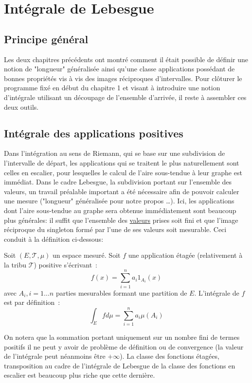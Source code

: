 \chapter{Intégrale de Lebesgue}
\section{Principe général}
Les deux chapitres précédents ont montré comment il était possible de définir
une notion de "longueur" généralisée ainsi qu'une classe applications possédant
de bonnes propriétés vis à vis des images réciproques d'intervalles. Pour
clôturer le programme fixé en début du chapitre 1 et visant à introduire une
notion d'intégrale utilisant un découpage de l'ensemble d'arrivée, il reste à
assembler ces deux outils.
\section{Intégrale des applications positives}
Dans l'intégration au sens de Riemann, qui se base sur une subdivision de
l'intervalle de départ, les applications qui se traitent le plus naturellement
sont celles en escalier, pour lesquelles le calcul de l'aire sous-tendue à leur
graphe est immédiat. Dans le cadre Lebesgue, la subdivision portant sur
l'ensemble des valeurs, un travail préalable important a été nécessaire afin de
pouvoir calculer une mesure ("longueur" généralisée pour notre propos \dots).
Ici, les applications dont l'aire sous-tendue au graphe sera obtenue
immédiatement sont beaucoup plus générales: il suffit que l'ensemble des
\underline{valeurs} prises soit fini et que l'image réciproque du singleton
formé par l'une de ses valeurs soit mesurable. Ceci conduit à la définition
ci-dessous:
\begin{mandatory}
\begin{defn}\label{ch3:int1}
Soit $(E, \mathcal{T}, \mu)$ un espace mesuré.
Soit $f$ une application étagée (relativement à la tribu $\mathcal{T}$) positive s'écrivant~:
\[
f(x) = \sum_{i=1}^n a_i 1_{A_i}(x)
\]
avec $A_i, i=1 \dots n$ parties mesurables formant une partition de $E$.
L'intégrale de $f$ est par définition~:
\[
\int_E f d\mu = \sum_{i=1}^n a_i \mu(A_i)
\]
\end{defn}
\end{mandatory}
On notera que la sommation portant uniquement sur un nombre fini de termes
positifs il ne peut y avoir de
problème de définition ou de convergence (la valeur de l'intégrale peut
néanmoins être $+\infty$). La classe des fonctions étagées,
transposition au cadre de l'intégrale de Lebesgue de la classe des fonctions en escalier est beaucoup plus riche que cette dernière.


